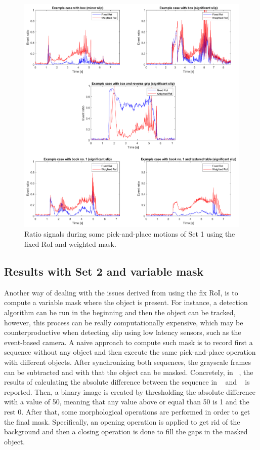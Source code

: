 \begin{figure}[H]
    \centering
    \includegraphics[width=\textwidth]{resources/images/fix_mask_rat}
    \caption{Ratio signals during some pick-and-place motions of Set 1 using the fixed RoI and weighted mask.}\label{fig:fix_mask_rat}
\end{figure}

\subsection{Results with Set 2 and variable mask}

Another way of dealing with the issues derived from using the fix RoI, is to compute a variable mask where the object is present. For instance, a detection algorithm can be run in the beginning and then the object can be tracked, however, this process can be really computationally expensive, which may be counterproductive when detecting slip using low latency sensors, such as the event-based camera. A naive approach to compute such mask is to record first a sequence without any object and then execute the same pick-and-place operation with different objects. After synchronizing both sequences, the grayscale frames can be subtracted and with that the object can be masked. Concretely, in ~, the results of calculating the absolute difference between the sequence in ~ and ~ is reported. Then, a binary image is created by thresholding the absolute difference with a value of 50, meaning that any value above or equal than 50 is 1 and the rest 0. After that, some morphological operations are performed in order to get the final mask. Specifically, an opening operation is applied to get rid of the background and then a closing operation is done to fill the gaps in the masked object.

